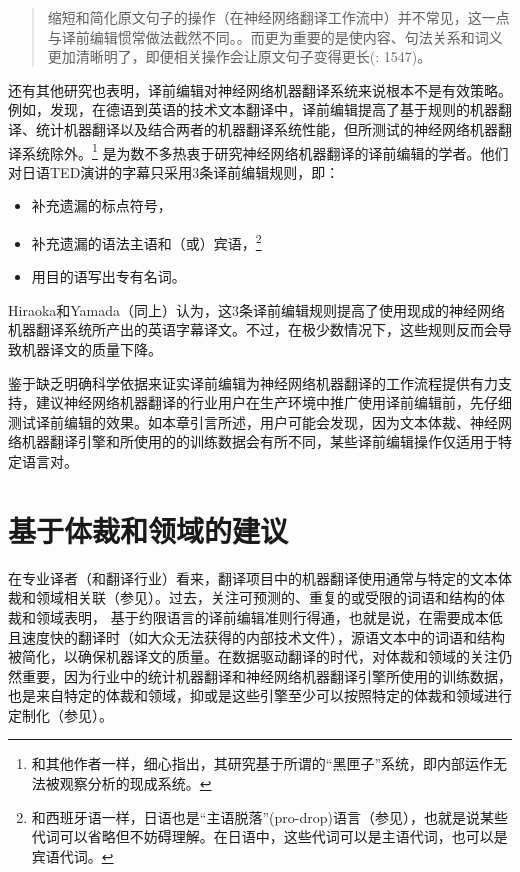 \documentclass[output=paper,colorlinks,citecolor=brown]{langscibook}
\begin{document}
\begin{quote}
缩短和简化原文句子的操作（在神经网络翻译工作流中）并不常见，这一点与译前编辑惯常做法截然不同。。而更为重要的是使内容、句法关系和词义更加清晰明了，即便相关操作会让原文句子变得更长(\citealt{MiyataFujita2021}: 1547)。
\end{quote}

还有其他研究也表明，译前编辑对神经网络机器翻译系统来说根本不是有效策略。例如，\citet{MarzoukHansen-Schirra2019}发现，在德语到英语的技术文本翻译中，译前编辑提高了基于规则的机器翻译、统计机器翻译以及结合两者的机器翻译系统性能，但所测试的神经网络机器翻译系统除外。\footnote{和其他作者一样，\citet{MarzoukHansen-Schirra2019}细心指出，其研究基于所谓的“黑匣子”系统，即内部运作无法被观察分析的现成系统。}  \citet{hiraoka-yamada-2019}是为数不多热衷于研究神经网络机器翻译的译前编辑的学者。他们对日语TED演讲的字幕只采用3条译前编辑规则，即：

\begin{itemize}
\item 补充遗漏的标点符号，
\item 补充遗漏的语法主语和（或）宾语，\footnote{和西班牙语一样，日语也是“主语脱落”(pro-drop)语言（参见），也就是说某些代词可以省略但不妨碍理解。在日语中，这些代词可以是主语代词，也可以是宾语代词。}
\item 用目的语写出专有名词。
\end{itemize}

Hiraoka和Yamada（同上）认为，这3条译前编辑规则提高了使用现成的神经网络机器翻译系统所产出的英语字幕译文。不过，在极少数情况下，这些规则反而会导致机器译文的质量下降。

鉴于缺乏明确科学依据来证实译前编辑为神经网络机器翻译的工作流程提供有力支持，建议神经网络机器翻译的行业用户在生产环境中推广使用译前编辑前，先仔细测试译前编辑的效果。如本章引言所述，用户可能会发现，因为文本体裁、神经网络机器翻译引擎和所使用的的训练数据会有所不同，某些译前编辑操作仅适用于特定语言对。


\section{基于体裁和领域的建议}

在专业译者（和翻译行业）看来，翻译项目中的机器翻译使用通常与特定的文本体裁和领域相关联（参见）。过去，关注可预测的、重复的或受限的词语和结构的体裁和领域表明， 基于约限语言的译前编辑准则行得通，也就是说，在需要成本低且速度快的翻译时（如大众无法获得的内部技术文件），源语文本中的词语和结构被简化，以确保机器译文的质量。在数据驱动翻译的时代，对体裁和领域的关注仍然重要，因为行业中的统计机器翻译和神经网络机器翻译引擎所使用的训练数据，也是来自特定的体裁和领域，抑或是这些引擎至少可以按照特定的体裁和领域进行定制化（参见）。
\end{document}
